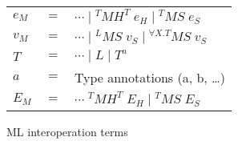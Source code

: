 \begin{figure}
\begin{center}
\begin{tabular}{lcl}
$e_{M}$ & $=$ & $\cdots\;\vert\;^{T}MH^{T}\;e_{H}\;\vert\;^{T}MS\;e_{S}$ \\
$v_{M}$ & $=$ & $\cdots\;\vert\;^{L}MS\;v_{S}\;\vert\;^{\forall X.T}MS\;v_{S}$ \\
$T$ & $=$ & $\cdots\;\vert\;L\;\vert\;T^{a}$ \\
$a$ & $=$ & Type annotations (a, b, \ldots) \\
$E_{M}$ & $=$ & $\cdots\;^{T}MH^{T}\;E_{H}\;\vert\;^{T}MS\;E_{S}$
\end{tabular}
\end{center}
\caption{ML interoperation terms}
\label{fig:mit}
\end{figure}